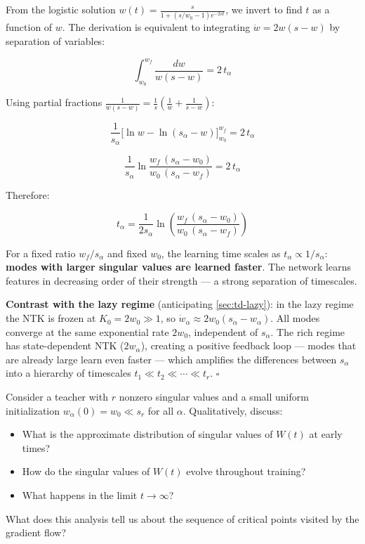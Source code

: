 \documentclass[11pt]{article}
\providecommand{\tightlist}{%
  \setlength{\itemsep}{0pt}\setlength{\parskip}{0pt}}
\begin{document}
\begin{solution}[ex:td-3b]
From the logistic solution
\(w(t) = \frac{s}{1 + (s/w_0 - 1)e^{-2st}}\), we invert to find \(t\) as
a function of \(w\). The derivation is equivalent to integrating
\(\dot{w} = 2w(s-w)\) by separation of variables:

\[\int_{w_0}^{w_f} \frac{dw}{w(s-w)} = 2\,t_\alpha\]

Using partial fractions
\(\frac{1}{w(s-w)} = \frac{1}{s}\!\left(\frac{1}{w} + \frac{1}{s-w}\right)\):

\[\frac{1}{s_\alpha}\Big[\ln w - \ln(s_\alpha - w)\Big]_{w_0}^{w_f} = 2\,t_\alpha\]

\[\frac{1}{s_\alpha}\ln\frac{w_f\,(s_\alpha - w_0)}{w_0\,(s_\alpha - w_f)} = 2\,t_\alpha\]

Therefore:

\[\boxed{t_\alpha = \frac{1}{2s_\alpha}\ln\left(\frac{w_f\,(s_\alpha - w_0)}{w_0\,(s_\alpha - w_f)}\right)}\]

For a fixed ratio \(w_f/s_\alpha\) and fixed \(w_0\), the learning time
scales as \(t_\alpha \propto 1/s_\alpha\): \textbf{modes with larger
singular values are learned faster}. The network learns features in
decreasing order of their strength --- a strong separation of
timescales.

\textbf{Contrast with the lazy regime} (anticipating \cref{sec:td-lazy}): in the
lazy regime the NTK is frozen at \(K_0 = 2w_0 \gg 1\), so
\(\dot{w}_\alpha \approx 2w_0(s_\alpha - w_\alpha)\). All modes converge
at the same exponential rate \(2w_0\), independent of \(s_\alpha\). The
rich regime has state-dependent NTK (\(2w_\alpha\)), creating a positive
feedback loop --- modes that are already large learn even faster ---
which amplifies the differences between \(s_\alpha\) into a hierarchy of
timescales \(t_1 \ll t_2 \ll \cdots \ll t_r\). \(\square\)
\end{solution}

\begin{exercise}
\label{ex:td-3c}
Consider a teacher with
\(r\) nonzero singular values and a small uniform initialization
\(w_\alpha(0) = w_0 \ll s_r\) for all \(\alpha\). Qualitatively, discuss:

\begin{itemize}
\tightlist
\item
  What is the approximate distribution of singular values of \(W(t)\) at early times?
\item
  How do the singular values of $W(t)$ evolve throughout training?
\item
  What happens in the limit \(t \to \infty\)?
\end{itemize}

What does this analysis tell us about the sequence of critical points visited by
the gradient flow?
\end{exercise}
\end{document}
